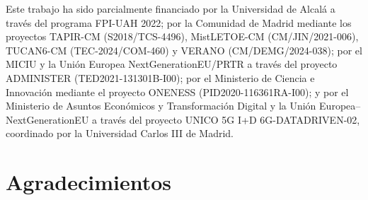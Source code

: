\vspace*{\fill}

\begin{flushleft}
\begin{minipage}{\textwidth}
\scriptsize
Este trabajo ha sido parcialmente financiado por la Universidad de Alcalá a través del programa FPI-UAH 2022; por la Comunidad de Madrid mediante los proyectos TAPIR-CM (S2018/TCS-4496), MistLETOE-CM (CM/JIN/2021-006), TUCAN6-CM (TEC-2024/COM-460) y VERANO (CM/DEMG/2024-038); por el MICIU y la Unión Europea NextGenerationEU/PRTR a través del proyecto ADMINISTER (TED2021-131301B-I00); por el Ministerio de Ciencia e Innovación mediante el proyecto ONENESS (PID2020-116361RA-I00); y por el Ministerio de Asuntos Económicos y Transformación Digital y la Unión Europea–NextGenerationEU a través del proyecto UNICO 5G I+D 6G-DATADRIVEN-02, coordinado por la Universidad Carlos III de Madrid.
\end{minipage}
\end{flushleft}







\vspace{1cm}

\clearemptydoublepage %

\chapter*{Agradecimientos}


